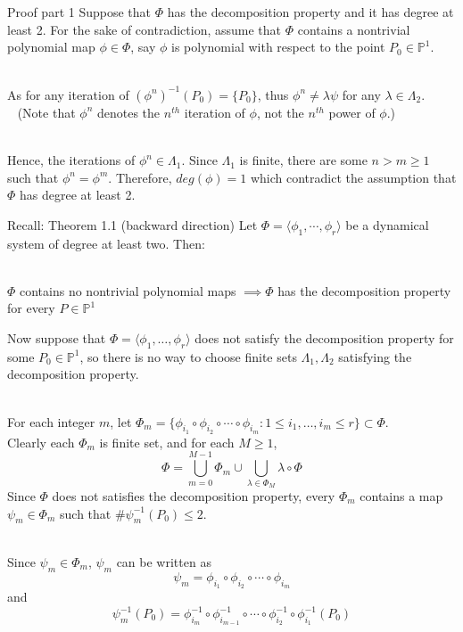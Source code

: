 \documentclass[aspectratio=169,xcolor=dvipsnames]{beamer}
\begin{document}
\begin{frame}{Proof part 1}
    Suppose that $\Phi$ has the decomposition property and it has degree at least 2. For the sake of contradiction, assume that $\Phi$ contains a nontrivial polynomial map $\phi \in \Phi$, say $\phi$ is polynomial with respect to the point $P_0\in \mathbb{P}^1$.\pause \\~
    
    As for any iteration of $(\phi^n)^{-1}(P_0) = \{P_0\}$, thus $\phi^n \neq \lambda \psi$ for any $\lambda \in \Lambda_2$.\\~
    (Note that $\phi^n$ denotes the $n^{th}$ iteration of $\phi$, not the $n^{th}$ power of $\phi$.) \pause \\~
    
    Hence, the iterations of $\phi^n \in \Lambda_1$. Since $\Lambda_1$ is finite, there are some $n>m\geq 1$ such that $\phi^n = \phi^m$. Therefore, $deg(\phi) = 1$ which contradict the assumption that $\Phi$ has degree at least 2.
\end{frame}
\begin{frame}
    \begin{block}{Recall: Theorem 1.1 (backward direction)}
         Let $\Phi = \langle \phi_1,\cdots,\phi_r\rangle$ be a dynamical system of degree at least two. Then:\\~
     
        $\Phi$ contains no nontrivial polynomial maps $\implies \Phi$ has the decomposition property for every $P\in \mathbb{P}^1$
    \end{block}
\end{frame}
\begin{frame}
    Now suppose that $\Phi = \langle\phi_1,\dots,\phi_r\rangle$ does not satisfy the decomposition property for some $P_0\in \mathbb{P}^1$, so there is no way to choose finite sets $\Lambda_1,\Lambda_2$ satisfying the decomposition property. \pause \\~
    
    For each integer $m$, let $\Phi_m=\{\phi_{i_1}\circ\phi_{i_2}\circ\cdots\circ\phi_{i_m}: 1\leq i_1,\dots,i_m \leq r\} \subset \Phi$.\pause \\
    Clearly each $\Phi_m$ is finite set, and for each $M\geq 1$, 
    $$\Phi = \bigcup_{m=0}^{M-1}\Phi_m \cup \bigcup_{\lambda\in \Phi_M}\lambda\circ \Phi$$
    \pause
    Since $\Phi$ does not satisfies the decomposition property, every $\Phi_m$ contains a map $\psi_m\in \Phi_m$ such that $\#\psi_m^{-1}(P_0)\leq 2$.\pause \\~
    
    Since $\psi_m \in \Phi_m$, $\psi_m$ can be written as $$\psi_m = \phi_{i_1}\circ\phi_{i_2}\circ\cdots\circ\phi_{i_m}$$ and $$\psi^{-1}_m(P_0)=\phi^{-1}_{i_m}\circ\phi^{-1}_{i_{m-1}}\circ\cdots\circ\phi^{-1}_{i_2}\circ\phi^{-1}_{i_1}(P_0)$$
\end{frame}
\end{document}
